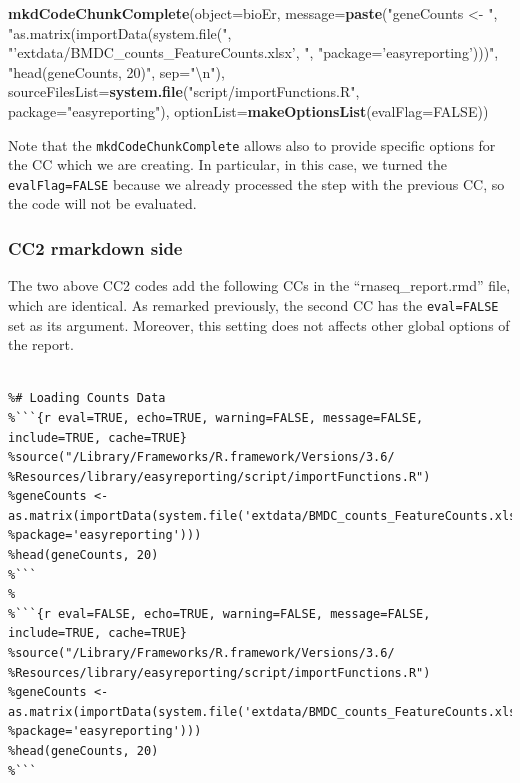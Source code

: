 \documentclass[]{article}
\newenvironment{Shaded}{\begin{snugshade}}{\end{snugshade}}
\newcommand{\CharTok}[1]{\textcolor[rgb]{0.31,0.60,0.02}{#1}}
\newcommand{\DataTypeTok}[1]{\textcolor[rgb]{0.13,0.29,0.53}{#1}}
\newcommand{\KeywordTok}[1]{\textcolor[rgb]{0.13,0.29,0.53}{\textbf{#1}}}
\newcommand{\NormalTok}[1]{#1}
\newcommand{\OtherTok}[1]{\textcolor[rgb]{0.56,0.35,0.01}{#1}}
\newcommand{\StringTok}[1]{\textcolor[rgb]{0.31,0.60,0.02}{#1}}
\begin{document}
\begin{Shaded}
\begin{Highlighting}[]
\KeywordTok{mkdCodeChunkComplete}\NormalTok{(}\DataTypeTok{object=}\NormalTok{bioEr, }\DataTypeTok{message=}\KeywordTok{paste}\NormalTok{(}\StringTok{"geneCounts <- "}\NormalTok{,  }
                  \StringTok{"as.matrix(importData(system.file("}\NormalTok{,}
                  \StringTok{"'extdata/BMDC_counts_FeatureCounts.xlsx', "}\NormalTok{, }
                  \StringTok{"package='easyreporting')))"}\NormalTok{, }\StringTok{"head(geneCounts, 20)"}\NormalTok{, }\DataTypeTok{sep=}\StringTok{"}\CharTok{\textbackslash{}n}\StringTok{"}\NormalTok{),}
                  \DataTypeTok{sourceFilesList=}\KeywordTok{system.file}\NormalTok{(}\StringTok{"script/importFunctions.R"}\NormalTok{, }
                  \DataTypeTok{package=}\StringTok{"easyreporting"}\NormalTok{), }
                  \DataTypeTok{optionList=}\KeywordTok{makeOptionsList}\NormalTok{(}\DataTypeTok{evalFlag=}\OtherTok{FALSE}\NormalTok{))}
\end{Highlighting}
\end{Shaded}

Note that the \texttt{mkdCodeChunkComplete} allows also to provide
specific options for the CC which we are creating. In particular, in
this case, we turned the \texttt{evalFlag=FALSE} because we already
processed the step with the previous CC, so the code will not be
evaluated.

\hypertarget{cc2-rmarkdown-side}{%
\subsubsection{CC2 rmarkdown side}\label{cc2-rmarkdown-side}}

The two above CC2 codes add the following CCs in the
``rnaseq\_report.rmd'' file, which are identical. As remarked
previously, the second CC has the \texttt{eval=FALSE} set as its
argument. Moreover, this setting does not affects other global options
of the report.

\begin{verbatim}
 
%# Loading Counts Data
%```{r eval=TRUE, echo=TRUE, warning=FALSE, message=FALSE, include=TRUE, cache=TRUE}
%source("/Library/Frameworks/R.framework/Versions/3.6/
%Resources/library/easyreporting/script/importFunctions.R")
%geneCounts <- as.matrix(importData(system.file('extdata/BMDC_counts_FeatureCounts.xlsx', 
%package='easyreporting')))
%head(geneCounts, 20)
%```
%
%```{r eval=FALSE, echo=TRUE, warning=FALSE, message=FALSE, include=TRUE, cache=TRUE}
%source("/Library/Frameworks/R.framework/Versions/3.6/
%Resources/library/easyreporting/script/importFunctions.R")
%geneCounts <- as.matrix(importData(system.file('extdata/BMDC_counts_FeatureCounts.xlsx', 
%package='easyreporting')))
%head(geneCounts, 20)
%```
\end{verbatim}
\end{document}
